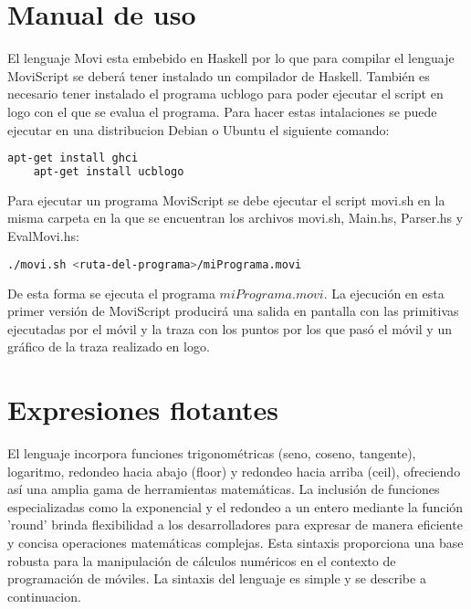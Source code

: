\documentclass[11pt]{scrartcl}
\begin{document}
\pagebreak
\section{Manual de uso}
El lenguaje Movi esta embebido en Haskell por lo que para compilar el lenguaje MoviScript 
se deber\'a tener instalado un compilador de Haskell. Tambi\'en es necesario tener instalado el 
programa ucblogo para poder ejecutar el script en logo con el que se evalua el programa.
Para hacer estas intalaciones se puede ejecutar en una distribucion Debian o Ubuntu el siguiente comando:
\begin{lstlisting}[language=bash]
    apt-get install ghci
    apt-get install ucblogo
\end{lstlisting}

Para ejecutar un programa MoviScript se debe ejecutar el script movi.sh en la misma 
carpeta en la que se encuentran los archivos movi.sh, Main.hs,
Parser.hs y EvalMovi.hs:
\begin{lstlisting}[language=bash]
    ./movi.sh <ruta-del-programa>/miPrograma.movi 
\end{lstlisting}
De esta forma se ejecuta el programa $miPrograma.movi$. La ejecuci\'on en esta primer versi\'on de 
MoviScript producir\'a una salida en pantalla con las primitivas ejecutadas por el m\'ovil y la traza
 con los puntos por los que pas\'o el m\'ovil y un gr\'afico de la traza realizado en logo.

\section{Expresiones flotantes}
El lenguaje incorpora funciones trigonom\'etricas 
(seno, coseno, tangente), logaritmo, redondeo hacia abajo (floor) 
y redondeo hacia arriba (ceil), ofreciendo as\'i una amplia gama de herramientas 
matem\'aticas. La inclusi\'on de funciones especializadas como 
la exponencial y el redondeo a un entero mediante la 
función 'round' brinda flexibilidad a los desarrolladores para 
expresar de manera eficiente y concisa operaciones 
matemáticas complejas. Esta sintaxis proporciona una base 
robusta para la manipulación de c\'alculos num\'ericos en 
el contexto de programación de m\'oviles.\newline
La sintaxis del lenguaje es simple y se describe a continuacion. 
\end{document}
